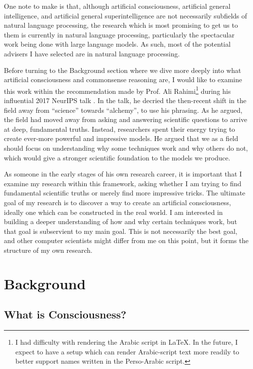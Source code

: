\documentclass[12pt]{report}
\begin{document}
One note to make is that, although artificial consciousness, artificial general intelligence, and artificial general superintelligence are not necessarily subfields of natural language processing, the research which is most promising to get us to them is currently in natural language processing, particularly the spectacular work being done with large language models.
As such, most of the potential advisers I have selected are in natural language processing.

Before turning to the Background section where we dive more deeply into what artificial consciousness and commonsense reasoning are, I would like to examine this work within the recommendation made by Prof. Ali Rahimi\footnote{I had difficulty with rendering the Arabic script in \LaTeX. In the future, I expect to have a setup which can render Arabic-script text more readily to better support names written in the Perso-Arabic script.} during his influential 2017 NeurIPS talk \cite{Rahimi2017-ax}.
In the talk, he decried the then-recent shift in the field away from \enquote{science} towards \enquote{alchemy}, to use his phrasing.
As he argued, the field had moved away from asking and answering scientific questions to arrive at deep, fundamental truths.
Instead, researchers spent their energy trying to create ever-more powerful and impressive models.
He argued that we as a field should focus on understanding why some techniques work and why others do not, which would give a stronger scientific foundation to the models we produce.

As someone in the early stages of his own research career, it is important that I examine my research within this framework, asking whether I am trying to find fundamental scientific truths or merely find more impressive tricks.
The ultimate goal of my research is to discover a way to create an artificial consciousness, ideally one which can be constructed in the real world.
I am interested in building a deeper understanding of how and why certain techniques work, but that goal is subservient to my main goal.
This is not necessarily the best goal, and other computer scientists might differ from me on this point, but it forms the structure of my own research.


\newpage
\chapter{Background}

\section{What is Consciousness?}
\end{document}
